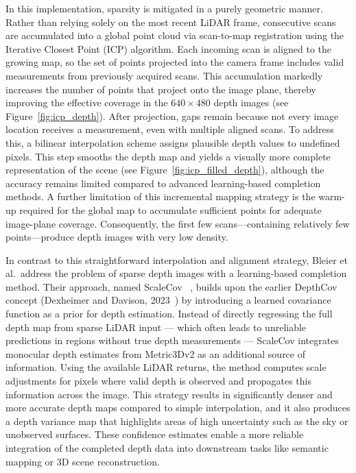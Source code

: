 \documentclass[english, bachelor, utf8]{base/thesis_telematics}
\begin{document}
In this implementation, sparsity is mitigated in a purely geometric manner. Rather than relying solely on the
most recent LiDAR frame, consecutive scans are accumulated into a global point cloud via scan-to-map registration
using the Iterative Closest Point (ICP) algorithm. Each incoming scan is aligned to the growing map, so the set
of points projected into the camera frame includes valid measurements from previously acquired scans. This
accumulation markedly increases the number of points that project onto the image plane, thereby improving the
effective coverage in the $640 \times 480$ depth images (see Figure~\ref{fig:icp_depth}).
After projection, gaps remain because not every image location receives a measurement, even with multiple
aligned scans. To address this, a bilinear interpolation scheme assigns plausible depth values to undefined
pixels. This step smooths the depth map and yields a visually more complete representation of the scene (see
Figure~\ref{fig:icp_filled_depth}), although the accuracy remains limited compared to advanced learning-based
completion methods.
A further limitation of this incremental mapping strategy is the warm-up required for the global map to
accumulate sufficient points for adequate image-plane coverage. Consequently, the first few scans—containing
relatively few points—produce depth images with very low density.

In contrast to this straightforward interpolation and alignment strategy, Bleier et al.\ address the problem
of sparse depth images with a learning-based completion method. Their approach, named ScaleCov
~\cite{bleier2024}, builds upon the earlier DepthCov concept (Dexheimer and Davison, 2023~\cite{dexheimer2023learning}) by introducing 
a learned covariance function as a prior for depth estimation. Instead of directly regressing the full depth 
map from sparse LiDAR input --- which often leads to unreliable predictions in regions without true depth 
measurements --- ScaleCov integrates monocular depth estimates from Metric3Dv2 as an additional source 
of information. Using the available LiDAR returns, the method computes scale adjustments for pixels 
where valid depth is observed and propagates this information across the image. This strategy results in 
significantly denser and more accurate depth maps compared to simple interpolation, and it also produces 
a depth variance map that highlights areas of high uncertainty such as the sky or unobserved surfaces. 
These confidence estimates enable a more reliable integration of the completed depth data into downstream 
tasks like semantic mapping or 3D scene reconstruction.
\end{document}
